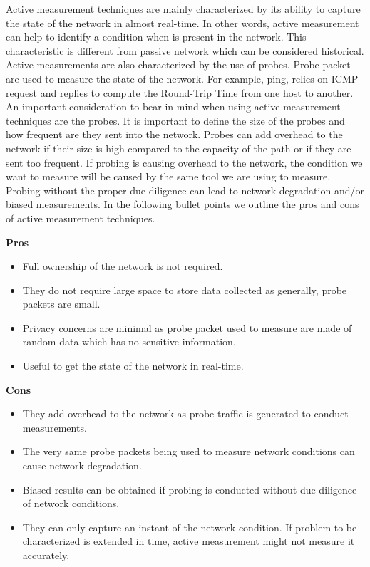 Active measurement techniques are mainly characterized by its ability to capture the state of the network in almost real-time. In other words, active measurement can help to identify a condition when is present in the network. This characteristic is different from passive network which can be considered historical. Active measurements are also characterized by the use of probes. Probe packet are used to measure the state of the network. For example, ping, relies on ICMP request and replies to compute the Round-Trip Time from one host to another. An important consideration to bear  in mind when using active measurement techniques are the probes. It is important to define the size of the probes and how frequent are they sent into the network. Probes can add overhead to the network if their size is high compared to the capacity of the path or if they are sent too frequent. If probing is causing overhead to the network, the condition we want to measure will be caused by the same tool we are using to measure. Probing without the proper due diligence can lead to network degradation and/or biased measurements. In the following bullet points we outline the pros and cons of active measurement techniques.

\textbf{Pros}
\begin{itemize}
	\item Full ownership of the network is not required.
	\item They do not require large space to store data collected as generally, probe packets are small.
	\item Privacy concerns are minimal as probe packet used to measure are made of random data which has no sensitive information.
	\item Useful to get the state of the network in real-time.
\end{itemize}
	

\textbf{Cons}
\begin{itemize}
	\item They add overhead to the network as probe traffic is generated to conduct measurements.
	\item The very same probe packets being used to measure network conditions can cause network degradation.
	\item Biased results can be obtained if probing is conducted without due diligence of network conditions.
	\item They can only capture an instant of the network condition. If problem to be characterized is extended in time, active measurement might not measure it accurately.
\end{itemize}

